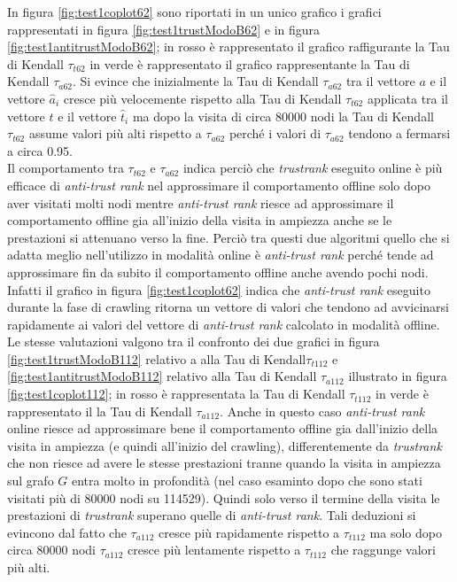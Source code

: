 In figura \ref{fig:test1coplot62} sono riportati in un unico grafico i grafici rappresentati in figura \ref{fig:test1trustModoB62}  e in figura \ref{fig:test1antitrustModoB62}; in rosso è rappresentato il grafico raffigurante la Tau di Kendall \(\tau_{t62}\) in verde è rappresentato il grafico  rappresentante la Tau di Kendall \(\tau_{a62}\). Si evince che inizialmente la Tau di Kendall \(\tau_{a62}\) tra il vettore \(a\) e il vettore \(\hat{a}_i\) cresce più velocemente rispetto alla Tau di Kendall \(\tau_{t62}\) applicata  tra il vettore \(t\) e il vettore \(\hat{t}_i\) ma dopo la visita di circa 80000 nodi la Tau di Kendall \(\tau_{t62}\) assume valori più alti rispetto a \(\tau_{a62}\) perché i valori di \(\tau_{a62}\) tendono a fermarsi a circa 0.95.\\
Il comportamento tra \(\tau_{t62}\) e \(\tau_{a62}\) indica perciò che \textit{trustrank} eseguito online è più efficace di \textit{anti-trust rank} nel approssimare il comportamento offline solo dopo aver  visitati molti nodi mentre \textit{anti-trust rank} riesce ad approssimare  il comportamento  offline gia all'inizio della visita in ampiezza anche se le prestazioni si attenuano verso la fine. Perciò tra questi due algoritmi quello che si adatta meglio nell'utilizzo in modalità online è \textit{anti-trust rank} perché tende ad approssimare fin da subito il comportamento offline anche avendo pochi nodi. Infatti il grafico in figura \ref{fig:test1coplot62} indica che \textit{anti-trust rank} eseguito durante la fase di crawling ritorna un vettore di valori che tendono ad avvicinarsi rapidamente ai valori del vettore di \textit{anti-trust rank} calcolato in modalità offline.\\
Le stesse valutazioni valgono tra il confronto dei due grafici in figura \ref{fig:test1trustModoB112} relativo a alla Tau di Kendall\(\tau_{t112}\) e \ref{fig:test1antitrustModoB112}  relativo alla Tau di Kendall \(\tau_{a112}\) illustrato in figura \ref{fig:test1coplot112}; in rosso è rappresentata la Tau di Kendall \(\tau_{t112}\) in verde è rappresentato il la Tau di Kendall \(\tau_{a112}\). Anche in questo caso \textit{anti-trust rank} online riesce ad approssimare bene  il comportamento offline gia dall'inizio della visita in ampiezza (e quindi all'inizio del crawling), differentemente da \textit{trustrank} che non riesce ad avere le stesse prestazioni tranne quando la visita in ampiezza sul grafo \(G\) entra molto in profondità (nel caso esaminto dopo che sono stati visitati più di 80000 nodi su 114529). Quindi solo verso il termine della visita le prestazioni di \textit{trustrank} superano quelle di \textit{anti-trust rank}. Tali deduzioni si evincono dal fatto che \(\tau_{a112}\) cresce più 
rapidamente rispetto a \(\tau_{t112}\) ma solo dopo circa 80000 nodi \(\tau_{a112}\) cresce più lentamente rispetto a \(\tau_{
t112}\) che raggunge valori più alti.



